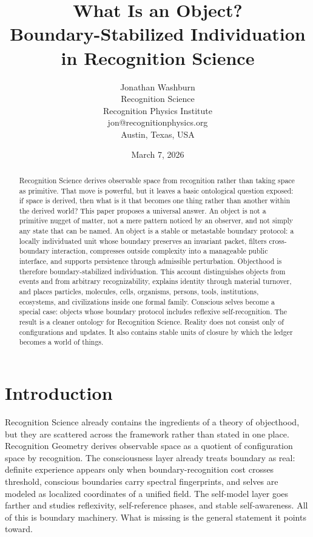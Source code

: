 \documentclass[11pt]{article}
\title{What Is an Object?\\Boundary-Stabilized Individuation in Recognition Science}
\author{Jonathan Washburn\\Recognition Science\\Recognition Physics Institute\\jon@recognitionphysics.org\\Austin, Texas, USA}
\date{March 7, 2026}
\begin{document}
\maketitle

\begin{abstract}
Recognition Science derives observable space from recognition rather than taking space as primitive.
That move is powerful, but it leaves a basic ontological question exposed: if space is derived, then what is it that becomes one thing rather than another within the derived world?
This paper proposes a universal answer.
An object is not a primitive nugget of matter, not a mere pattern noticed by an observer, and not simply any state that can be named.
An object is a stable or metastable boundary protocol: a locally individuated unit whose boundary preserves an invariant packet, filters cross-boundary interaction, compresses outside complexity into a manageable public interface, and supports persistence through admissible perturbation.
Objecthood is therefore boundary-stabilized individuation.
This account distinguishes objects from events and from arbitrary recognizability, explains identity through material turnover, and places particles, molecules, cells, organisms, persons, tools, institutions, ecosystems, and civilizations inside one formal family.
Conscious selves become a special case: objects whose boundary protocol includes reflexive self-recognition.
The result is a cleaner ontology for Recognition Science.
Reality does not consist only of configurations and updates.
It also contains stable units of closure by which the ledger becomes a world of things.
\end{abstract}

\section{Introduction}

Recognition Science already contains the ingredients of a theory of objecthood, but they are scattered across the framework rather than stated in one place.
Recognition Geometry derives observable space as a quotient of configuration space by recognition.
The consciousness layer already treats boundary as real: definite experience appears only when boundary-recognition cost crosses threshold, conscious boundaries carry spectral fingerprints, and selves are modeled as localized coordinates of a unified field.
The self-model layer goes farther and studies reflexivity, self-reference phases, and stable self-awareness.
All of this is boundary machinery.
What is missing is the general statement it points toward.
\end{document}
